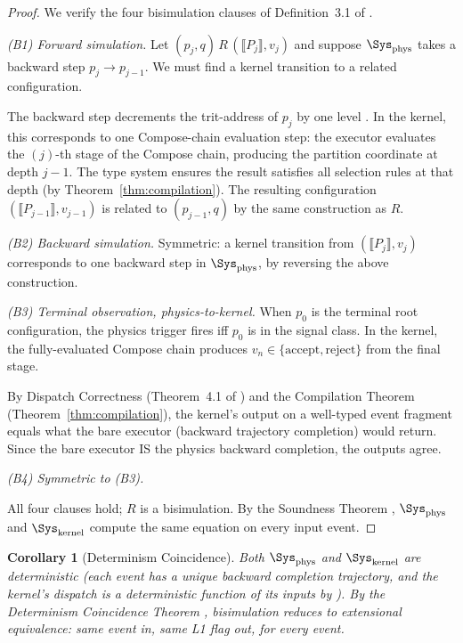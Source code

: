\documentclass[twocolumn,10pt,a4paper]{article}
\theoremstyle{thmstyle}
\newtheorem{corollary}[theorem]{Corollary}
\theoremstyle{definition}
\theoremstyle{remark}
\begin{document}
\begin{proof}
We verify the four bisimulation clauses of Definition~3.1 of \citet{companion:bisim}.

\emph{(B1) Forward simulation.} Let $(p_j, q) \, R \, (\llbracket P_j\rrbracket, v_j)$
and suppose $\Sys_{\mathrm{phys}}$ takes a backward step $p_j \to p_{j-1}$.
We must find a kernel transition to a related configuration.

The backward step decrements the trit-address of $p_j$ by one level
\citep{companion:trajectory}. In the kernel, this corresponds to one
Compose-chain evaluation step: the executor evaluates the $(j)$-th stage
of the Compose chain, producing the partition coordinate at depth $j-1$.
The type system ensures the result satisfies all selection rules at that
depth (by Theorem~\ref{thm:compilation}). The resulting configuration
$(\llbracket P_{j-1}\rrbracket, v_{j-1})$ is related to $(p_{j-1}, q)$
by the same construction as $R$.

\emph{(B2) Backward simulation.} Symmetric: a kernel transition from
$(\llbracket P_j\rrbracket, v_j)$ corresponds to one backward step
in $\Sys_{\mathrm{phys}}$, by reversing the above construction.

\emph{(B3) Terminal observation, physics-to-kernel.} When $p_0$ is the
terminal root configuration, the physics trigger fires iff $p_0$ is in
the signal class. In the kernel, the fully-evaluated Compose chain produces
$v_n \in \{\mathrm{accept}, \mathrm{reject}\}$ from the final stage.

By Dispatch Correctness (Theorem~4.1 of \citealt{companion:kernel}) and
the Compilation Theorem (Theorem~\ref{thm:compilation}), the kernel's
output on a well-typed event fragment equals what the bare executor
(backward trajectory completion) would return. Since the bare executor IS
the physics backward completion, the outputs agree.

\emph{(B4) Symmetric to (B3).}

All four clauses hold; $R$ is a bisimulation. By the Soundness Theorem
\citep{companion:bisim}, $\Sys_{\mathrm{phys}}$ and $\Sys_{\mathrm{kernel}}$
compute the same equation on every input event.
\end{proof}

\begin{corollary}[Determinism Coincidence]
Both $\Sys_{\mathrm{phys}}$ and $\Sys_{\mathrm{kernel}}$ are deterministic
(each event has a unique backward completion trajectory, and the kernel's
dispatch is a deterministic function of its inputs by
\citealt{companion:kernel}). By the Determinism Coincidence Theorem
\citep{companion:bisim}, bisimulation reduces to extensional equivalence:
same event in, same L1 flag out, for every event.
\end{corollary}
\end{document}

